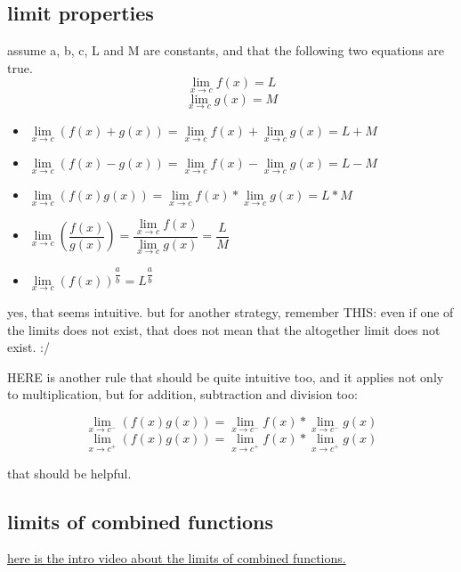 \documentclass[11pt,a4paper]{article}
\begin{document}
\subsection{limit properties}
assume a, b, c, L and M are constants, and that the following two equations are true.
$$\lim \limits_{x \to c} f(x) = L$$
$$\lim \limits_{x \to c} g(x) = M$$

\begin{itemize}
  \item $\lim \limits_{x \to c} \left( f(x)+g(x) \right) = \lim \limits_{x \to c} f(x) + \lim \limits_{x \to c} g(x) = L+M$
  \item $\lim \limits_{x \to c} \left( f(x)-g(x) \right) = \lim \limits_{x \to c} f(x) - \lim \limits_{x \to c} g(x) = L-M$
  \item $\lim \limits_{x \to c} \left( f(x)g(x) \right) = \lim \limits_{x \to c} f(x) * \lim \limits_{x \to c} g(x) = L*M$
  \item $\lim \limits_{x \to c} \left( \dfrac{f(x)}{g(x)} \right) = \dfrac{ \lim \limits_{x \to c} f(x) }{ \lim \limits_{x \to c} g(x) } = \dfrac{L}{M}$
  \item $\lim \limits_{x \to c} \left( f(x) \right) ^{\dfrac{a}{b}} = L^{\dfrac{a}{b}}$
\end{itemize}

yes, that seems intuitive. but for another strategy, remember THIS: even if one of the limits does not exist, that does not mean that the altogether limit does not exist. :/

HERE is another rule that should be quite intuitive too, and it applies not only to multiplication, but for addition, subtraction and division too:

$$\lim \limits_{x \to c^-} \left( f(x)g(x) \right) = \lim \limits_{x \to c^-} f(x) * \lim \limits_{x \to c^-} g(x)$$
$$\lim \limits_{x \to c^+} \left( f(x)g(x) \right) = \lim \limits_{x \to c^+} f(x) * \lim \limits_{x \to c^+} g(x)$$

that should be helpful.

\vspace{40pt}

\subsection{limits of combined functions}

\href{https://www.khanacademy.org/math/ap-calculus-ab/ab-limits-new/ab-1-5a/v/limits-of-combined-functions-piecewise}{here is the intro video about the limits of combined functions.}
\end{document}
